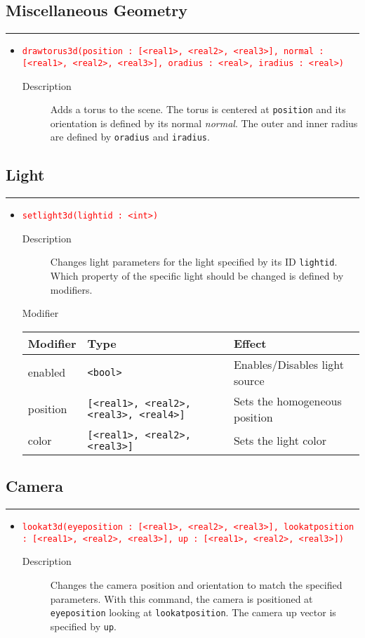 \documentclass[10pt,a4widepaper]{scrartcl}
\newcommand{\csubsection}[1]{\subsection*{#1}\vspace{-0.55cm}\textcolor{CBlue}{\rule[1ex]{\textwidth}{0.4pt}}}
\newcommand{\cRed}[1]{\textcolor{red}{\texttt{#1}}}
\newcommand{\desc}{\item[Description]}
\begin{document}
\csubsection{Miscellaneous Geometry}
\begin{itemize}

\item \cRed{drawtorus3d(position : [<real1>, <real2>, <real3>], normal : [<real1>, <real2>, <real3>], oradius : <real>, iradius : <real>)}
\begin{description}
\desc Adds a torus to the scene. The torus is centered at \texttt{position} and its orientation is defined by its normal \textit{normal}. The outer and inner radius are defined by \texttt{oradius} and \texttt{iradius}.
\end{description}
\end{itemize}

\csubsection{Light}
\begin{itemize}

\item \cRed{setlight3d(lightid : <int>)}
\begin{description}
\desc Changes light parameters for the light specified by its ID \texttt{lightid}. Which property of the specific light should be changed is defined by modifiers.
\item[Modifier]
\end{description}
\begin{center}
\begin{tabular}{l|l|l}
Modifier & Type & Effect \\ 
\hline enabled & \texttt{<bool>} & Enables/Disables light source\\
\hline position & \texttt{[<real1>, <real2>, <real3>, <real4>]} & Sets the homogeneous position \\ 
\hline color & \texttt{[<real1>, <real2>, <real3>]} & Sets the light color
\end{tabular}
\end{center}
\end{itemize}

\csubsection{Camera}
\begin{itemize}
\item \cRed{lookat3d(eyeposition : [<real1>, <real2>, <real3>], lookatposition : [<real1>, <real2>, <real3>], up : [<real1>, <real2>, <real3>])}
\begin{description}
\desc Changes the camera position and orientation to match the specified parameters. With this command, the camera is positioned at \texttt{eyeposition} looking at \texttt{lookatposition}. The camera up vector is specified by \texttt{up}.
\end{description}
\end{itemize}
\end{document}
